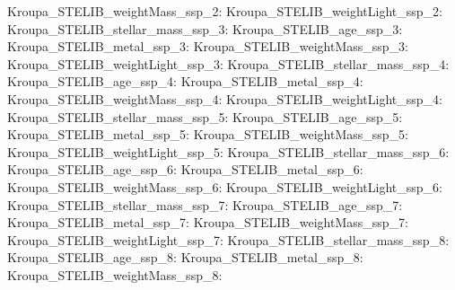 Kroupa\_STELIB\_weightMass\_ssp\_2:  \newline 
Kroupa\_STELIB\_weightLight\_ssp\_2:  \newline 
Kroupa\_STELIB\_stellar\_mass\_ssp\_3:  \newline 
Kroupa\_STELIB\_age\_ssp\_3:  \newline 
Kroupa\_STELIB\_metal\_ssp\_3:  \newline 
Kroupa\_STELIB\_weightMass\_ssp\_3:  \newline 
Kroupa\_STELIB\_weightLight\_ssp\_3:  \newline 
Kroupa\_STELIB\_stellar\_mass\_ssp\_4:  \newline 
Kroupa\_STELIB\_age\_ssp\_4:  \newline 
Kroupa\_STELIB\_metal\_ssp\_4:  \newline 
Kroupa\_STELIB\_weightMass\_ssp\_4:  \newline 
Kroupa\_STELIB\_weightLight\_ssp\_4:  \newline 
Kroupa\_STELIB\_stellar\_mass\_ssp\_5:  \newline 
Kroupa\_STELIB\_age\_ssp\_5:  \newline 
Kroupa\_STELIB\_metal\_ssp\_5:  \newline 
Kroupa\_STELIB\_weightMass\_ssp\_5:  \newline 
Kroupa\_STELIB\_weightLight\_ssp\_5:  \newline 
Kroupa\_STELIB\_stellar\_mass\_ssp\_6:  \newline 
Kroupa\_STELIB\_age\_ssp\_6:  \newline 
Kroupa\_STELIB\_metal\_ssp\_6:  \newline 
Kroupa\_STELIB\_weightMass\_ssp\_6:  \newline 
Kroupa\_STELIB\_weightLight\_ssp\_6:  \newline 
Kroupa\_STELIB\_stellar\_mass\_ssp\_7:  \newline 
Kroupa\_STELIB\_age\_ssp\_7:  \newline 
Kroupa\_STELIB\_metal\_ssp\_7:  \newline 
Kroupa\_STELIB\_weightMass\_ssp\_7:  \newline 
Kroupa\_STELIB\_weightLight\_ssp\_7:  \newline 
Kroupa\_STELIB\_stellar\_mass\_ssp\_8:  \newline 
Kroupa\_STELIB\_age\_ssp\_8:  \newline 
Kroupa\_STELIB\_metal\_ssp\_8:  \newline 
Kroupa\_STELIB\_weightMass\_ssp\_8:  \newline 
